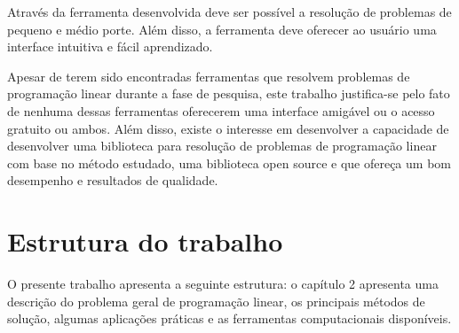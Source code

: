 Através da ferramenta desenvolvida deve ser possível a resolução de problemas de pequeno e médio porte. Além disso, a ferramenta deve oferecer ao usuário uma interface intuitiva e fácil aprendizado.

Apesar de terem sido encontradas ferramentas que resolvem problemas de programação linear durante a fase de pesquisa, este trabalho justifica-se pelo fato de nenhuma dessas ferramentas oferecerem uma interface amigável ou o acesso gratuito ou ambos. Além disso, existe o interesse em desenvolver a capacidade de desenvolver uma biblioteca para resolução de problemas de programação linear com base no método estudado, uma biblioteca open source e que ofereça um bom desempenho e resultados de qualidade.

\section{Estrutura do trabalho}
O presente trabalho apresenta a seguinte estrutura: o capítulo 2 apresenta uma descrição do problema geral de programação linear, os principais métodos de solução, algumas aplicações práticas e as ferramentas computacionais disponíveis. 
